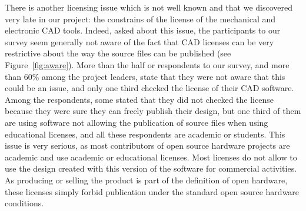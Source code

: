 \documentclass[letterpaper, 10 pt, conference]{ieeeconf}  %
\begin{document}
There is another licensing issue which is not well known and that we discovered very late in our project: the constrains of the license of the mechanical and electronic CAD tools. 
Indeed, asked about this issue, the participants to our survey seem generally not aware of the fact that CAD licenses can be very restrictive about the way the source files can be published (see Figure~\ref{fig:aware}).
More than the half or respondents to our survey, and more than 60\% among the project leaders, state that they were not aware that this could be an issue, and only one third checked the license of their CAD software. 
Among the respondents, some stated that they did not checked the license because they were sure they can freely publish their design, but one third of them are using software not allowing the publication of source files when using educational licenses, and all these respondents are academic or students.
This issue is very serious, as most contributors of open source hardware projects are academic and use academic or educational licenses. 
Most licenses do not allow to use the design created with this version of the software for commercial activities. 
As producing or selling the product is part of the definition of open hardware, these licenses simply forbid publication under the standard open source hardware conditions. 
\end{document}
